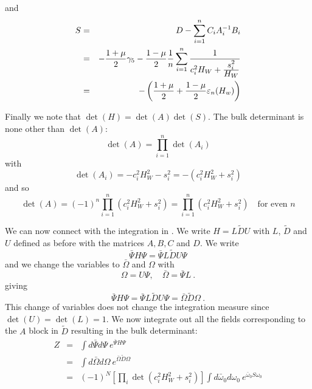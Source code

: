 \documentclass[12pt]{article}
\begin{document}
and 
\begin{eqnarray}
S &=& D - \sum_{i=1}^{n} C_i A_i^{-1} B_{i} \\
  &=& -\frac{1+\mu}{2} \gamma_5 -  \frac{1-\mu}{2} \frac{1}{n} \sum_{i=1}^{n}  \frac{1}{c_i^2 H_W + \frac{\displaystyle s_i^2}{\displaystyle H_W} } \\
  &=& - \left( \frac{1+\mu}{2} + \frac{1-\mu}{2} \varepsilon_{n}(H_w) \right) 
\end{eqnarray}

Finally we note that $\det(H) = \det(A) \det(S)$. The bulk determinant is 
none other than $\det(A)$:
\begin{equation}
\det(A) = \prod_{i=1}^{n} \det(A_i)
\end{equation}
with 
\begin{equation}
\det(A_i) = -c_i^{2} H_W^{2} - s_i^2 = -( c_i^2 H_W^2 + s_i^2 )
\end{equation}
and so
\begin{equation}
\det(A) = (-1)^{n} \prod_{i=1}^{n} ( c_i^2 H_W^2 + s_i^2 ) = \prod_{i=1}^{n} ( c_i^2 H_W^2 + s_i^2 ) \quad \mbox{for even $n$}
\end{equation}

We can now connect with the integration in \cite{NeubergerNarayanan}. We 
write $H = L \tilde{D} U$ with $L$, $\tilde{D}$ and $U$ defined as before with the matrices
$A, B, C$ and $D$. We write
\begin{equation}
\bar{\Psi} H \Psi = \bar{\Psi} L \tilde{D} U \Psi 
\end{equation}
and we change the variables to $\bar{\Omega}$ and $\Omega$
with 
\begin{equation} 
\Omega = U \Psi, \quad \bar{\Omega} = \bar{\Psi} L \ .
\end{equation}
giving 
\begin{equation}
\bar{\Psi} H \Psi = \bar{\Psi} L \tilde{D} U \Psi = \bar{\Omega} \tilde{D} \Omega \ .
\end{equation}
This change of variables does not change the integration measure since
$\det(U) = \det(L) = 1$. We now integrate out all the fields corresponding
to the $A$ block in $\tilde{D}$ resulting in the bulk determinant:
\begin{eqnarray}
Z &=& \int d\bar{\Psi} d\Psi \  e^{\displaystyle \bar{\Psi} H \Psi} \\
  &=& \int d\bar{\Omega} d\Omega \ e^{\displaystyle \bar{\Omega} \tilde{D} \Omega } \\
  &=& (-1)^N \left[ \prod_{i} \det( c_i^2 H_W^2 + s_i^2 ) \right] \int d\bar{\omega}_0 d\omega_0 \  e^{\displaystyle \bar{\omega}_0  S  \omega_0 }
\end{eqnarray}
\end{document}
